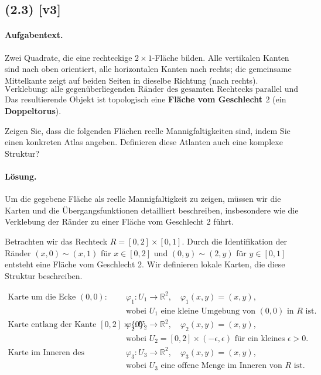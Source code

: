 \documentclass[11pt,a4paper]{article}
\begin{document}

\subsection*{(2.3) [v3]}
\paragraph{Aufgabentext.}
Zwei Quadrate, die eine rechteckige $2\times1$-Fläche bilden.  
Alle vertikalen Kanten sind nach oben orientiert, 
alle horizontalen Kanten nach rechts; 
die gemeinsame Mittelkante zeigt auf beiden Seiten in dieselbe Richtung (nach rechts).  
\[
\text{Verklebung: alle gegenüberliegenden Ränder des gesamten Rechtecks parallel und gleich orientiert.}
\]
Das resultierende Objekt ist topologisch eine \textbf{Fläche vom Geschlecht $2$} (ein \textbf{Doppeltorus}).

Zeigen Sie, dass die folgenden Flächen reelle Mannigfaltigkeiten sind, indem Sie einen konkreten Atlas angeben. Definieren diese Atlanten auch eine komplexe Struktur?

\paragraph{Lösung.}
Um die gegebene Fläche als reelle Mannigfaltigkeit zu zeigen, müssen wir die Karten und die Übergangsfunktionen detailliert beschreiben, insbesondere wie die Verklebung der Ränder zu einer Fläche vom Geschlecht 2 führt.

Betrachten wir das Rechteck $R = [0, 2] \times [0, 1]$. Durch die Identifikation der Ränder $(x, 0) \sim (x, 1)$ für $x \in [0, 2]$ und $(0, y) \sim (2, y)$ für $y \in [0, 1]$ entsteht eine Fläche vom Geschlecht 2. Wir definieren lokale Karten, die diese Struktur beschreiben.

\begin{align*}
\text{Karte um die Ecke } (0,0): \quad & \varphi_1: U_1 \to \mathbb{R}^2, \quad \varphi_1(x,y) = (x,y), \\
& \text{wobei } U_1 \text{ eine kleine Umgebung von } (0,0) \text{ in } R \text{ ist.} \\
\text{Karte entlang der Kante } [0,2] \times \{0\}: \quad & \varphi_2: U_2 \to \mathbb{R}^2, \quad \varphi_2(x,y) = (x,y), \\
& \text{wobei } U_2 = [0,2] \times (-\epsilon, \epsilon) \text{ für ein kleines } \epsilon > 0. \\
\text{Karte im Inneren des Rechtecks:} \quad & \varphi_3: U_3 \to \mathbb{R}^2, \quad \varphi_3(x,y) = (x,y), \\
& \text{wobei } U_3 \text{ eine offene Menge im Inneren von } R \text{ ist.}
\end{align*}
\end{document}

